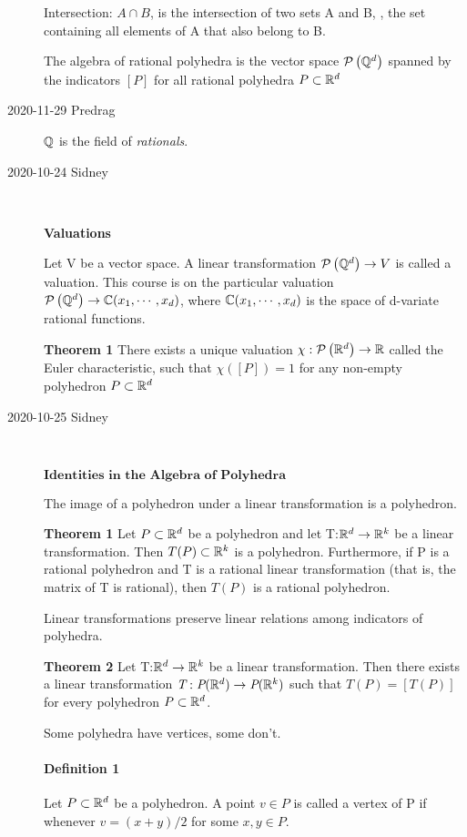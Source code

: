 \begin{description}
Intersection: $A\cap B$, is the intersection of two sets A and B,
\ie, the set
containing all elements of A that also belong to B.

The algebra of rational polyhedra is the vector space
${\mathcal{P}}\left({\mathbb{Q}}^d\right)$ spanned by the indicators $[P]$ for all
rational polyhedra $P\subset \mathbb{R}^d$

\item[2020-11-29 Predrag]
$\mathbb{Q}$ is the
{field of {\em rationals}}.

\item[2020-10-24 Sidney]~~

\textbf{Valuations}

Let V be a vector space. A linear transformation
${\mathcal{P}}\left({\mathbb{Q}}^d\right)\rightarrow V$ is called a valuation. This
course is on the particular valuation
${\mathcal{P}}\left({\mathbb{Q}}^d\right)\rightarrow {\ensuremath{\mathbb{C}}}(x_1,\cdots ,x_d)$, where
${\mathbb{C}}(x_1,\cdots ,x_d)$ is the space of d-variate rational functions.

\textbf{Theorem 1}
There exists a unique valuation
$\chi:{\mathcal{P}}\left(\mathbb{R}^d\right)\rightarrow\mathbb{R}$ called the Euler
characteristic, such that $\chi([P])=1$ for any non-empty polyhedron
$P\subset\mathbb{R}^d$

\item[2020-10-25 Sidney]~

$\textbf{Identities in the Algebra of Polyhedra}$

The image of a polyhedron under a linear transformation is a polyhedron.

\textbf{Theorem 1} Let $P\subset\mathbb{R}^d$ be a polyhedron and let T:$\mathbb{R}^d\rightarrow\mathbb{R}^k$ be a linear transformation. Then $T(P)\subset\mathbb{R}^k$ is a polyhedron. Furthermore, if P is a rational polyhedron and T is a rational linear transformation (that is, the matrix of T is rational), then $T(P)$ is a rational polyhedron.

Linear transformations preserve linear relations among indicators of polyhedra.

\textbf{Theorem 2} Let T:$\mathbb{R}^d\rightarrow\mathbb{R}^k$ be a linear transformation. Then there exists a linear transformation $\textit{T}:\textit{P}(\mathbb{R}^d)\rightarrow\textit{P}(\mathbb{R}^k)$ such that $\textit{T}(P)=[T(P)]$ for every polyhedron $P\subset\mathbb{R}^d$.

Some polyhedra have vertices, some don't.

\paragraph{Definition  1} Let $P\subset\mathbb{R}^d$ be a polyhedron. A point $v\in P$ is called a vertex of P if whenever $v=(x+y)/2$ for some $x,y\in P$.


\end{description}
